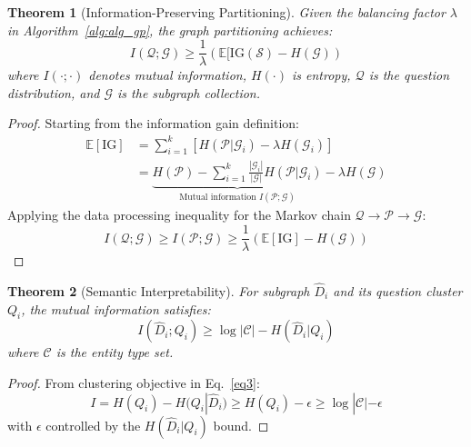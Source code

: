 \documentclass[sigconf]{acmart}
\newtheorem{theorem}{Theorem}
\begin{document}
\begin{theorem}[Information-Preserving Partitioning]
\label{thm:info-preserve}
Given the balancing factor $\lambda$ in Algorithm~\ref{alg:alg_gp}, the graph partitioning achieves:
\begin{equation} \label{eq3}
I(\mathcal{Q}; \mathcal{G}) \geq \frac{1}{\lambda}\left(\mathbb{E}[\mathrm{IG}(\mathcal{S}) - H(\mathcal{G})\right)
\end{equation}
where $I(\cdot;\cdot)$ denotes mutual information, $H(\cdot)$ is entropy, $\mathcal{Q}$ is the question distribution, and $\mathcal{G}$ is the subgraph collection.
\end{theorem}

\begin{proof}
Starting from the information gain definition:
\begin{align}
\mathbb{E}[\mathrm{IG}] &= \sum_{i=1}^k \left[H(\mathcal{P}|\mathcal{G}_i) - \lambda H(\mathcal{G}_i)\right] \\
&= \underbrace{H(\mathcal{P}) - \sum_{i=1}^k \frac{|\mathcal{G}_i|}{|\mathcal{G}|}H(\mathcal{P}|\mathcal{G}_i)}_{\text{Mutual information }I(\mathcal{P};\mathcal{G})} - \lambda H(\mathcal{G})
\end{align}
Applying the data processing inequality for the Markov chain $\mathcal{Q} \rightarrow \mathcal{P} \rightarrow \mathcal{G}$:
\begin{equation}
I(\mathcal{Q};\mathcal{G}) \geq I(\mathcal{P};\mathcal{G}) \geq \frac{1}{\lambda}\left(\mathbb{E}[\mathrm{IG}] - H(\mathcal{G})\right)
\end{equation}
\end{proof}

\begin{theorem}[Semantic Interpretability]
\label{thm:info-interpretably}
For subgraph $\hat{D}_i$ and its question cluster $Q_i$, the mutual information satisfies:
\begin{equation}
I(\hat{D}_i; Q_i) \geq \log|\mathcal{C}| - H(\hat{D}_i|Q_i)
\end{equation}
where $\mathcal{C}$ is the entity type set.
\end{theorem}
\begin{proof}
From clustering objective in Eq.~\ref{eq3}:
\begin{equation}
I = H(Q_i) - H(Q_i|\hat{D}_i) \geq H(Q_i) - \epsilon \geq \log|\mathcal{C}| - \epsilon
\end{equation}
with $\epsilon$ controlled by the $H(\hat{D}_i|Q_i)$ bound. 
\end{proof}
\end{document}
